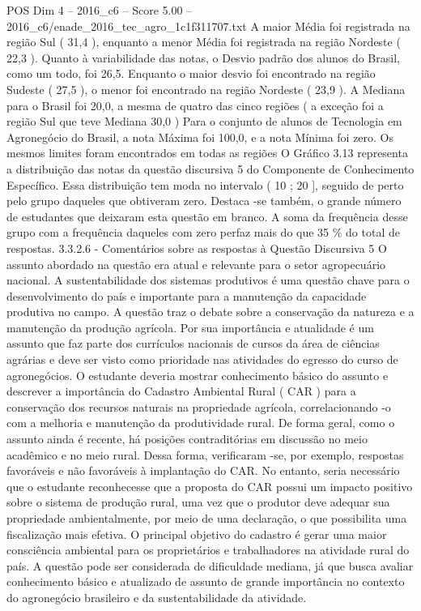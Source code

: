 \begin{textsample}{POS Dim 4 – 2016\_c6 – Score 5.00 – 2016\_c6/enade\_2016\_tec\_agro\_1c1f311707.txt}
A maior Média foi registrada na região Sul ( 31,4 ), enquanto a menor Média foi registrada na região Nordeste ( 22,3 ).
Quanto à variabilidade das notas, o Desvio padrão dos alunos do Brasil, como um todo, foi 26,5.
Enquanto o maior desvio foi encontrado na região Sudeste ( 27,5 ), o menor foi encontrado na região Nordeste ( 23,9 ).
A Mediana para o Brasil foi 20,0, a mesma de quatro das cinco regiões ( a exceção foi a região Sul que teve Mediana 30,0 ) Para o conjunto de alunos de Tecnologia em Agronegócio do Brasil, a nota Máxima foi 100,0, e a nota Mínima foi zero.
Os mesmos limites foram encontrados em todas as regiões O Gráfico 3.13 representa a distribuição das notas da questão discursiva 5 do Componente de Conhecimento Específico.
Essa distribuição tem moda no intervalo ( 10 ; 20 ], seguido de perto pelo grupo daqueles que obtiveram zero.
Destaca -se também, o grande número de estudantes que deixaram esta questão em branco.
A soma da frequência desse grupo com a frequência daqueles com zero perfaz mais do que 35 \% do total de respostas. 3.3.2.6 - Comentários sobre as respostas à Questão Discursiva 5 O assunto abordado na questão era atual e relevante para o setor agropecuário nacional.
A sustentabilidade dos sistemas produtivos é uma questão chave para o desenvolvimento do país e importante para a manutenção da capacidade produtiva no campo.
A questão traz o debate sobre a conservação da natureza e a manutenção da produção agrícola.
Por sua importância e atualidade é um assunto que faz parte dos currículos nacionais de cursos da área de ciências agrárias e deve ser visto como prioridade nas atividades do egresso do curso de agronegócios.
O estudante deveria mostrar conhecimento básico do assunto e descrever a importância do Cadastro Ambiental Rural ( CAR ) para a conservação dos recursos naturais na propriedade agrícola, correlacionando -o com a melhoria e manutenção da produtividade rural.
De forma geral, como o assunto ainda é recente, há posições contraditórias em discussão no meio acadêmico e no meio rural.
Dessa forma, verificaram -se, por exemplo, respostas favoráveis e não favoráveis à implantação do CAR.
No entanto, seria necessário que o estudante reconhecesse que a proposta do CAR possui um impacto positivo sobre o sistema de produção rural, uma vez que o produtor deve adequar sua propriedade ambientalmente, por meio de uma declaração, o que possibilita uma fiscalização mais efetiva.
O principal objetivo do cadastro é gerar uma maior consciência ambiental para os proprietários e trabalhadores na atividade rural do país.
A questão pode ser considerada de dificuldade mediana, já que busca avaliar conhecimento básico e atualizado de assunto de grande importância no contexto do agronegócio brasileiro e da sustentabilidade da atividade.

\end{textsample}
